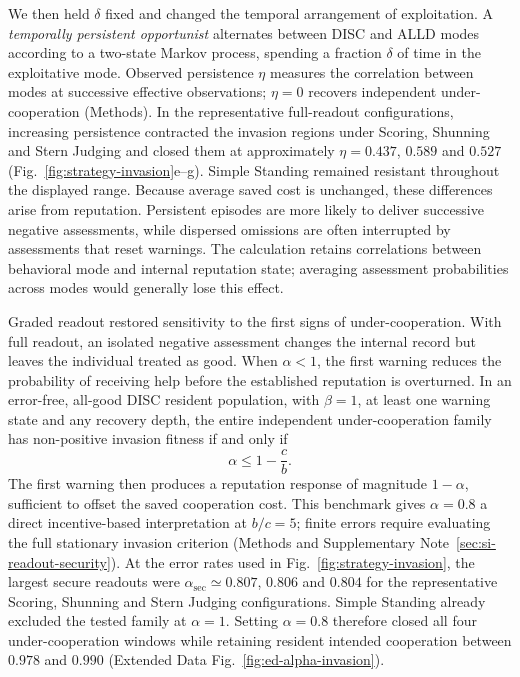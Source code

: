 \documentclass[fleqn,10pt]{wlscirep}
\begin{document}
We then held $\delta$ fixed and changed the temporal arrangement of exploitation. A \emph{temporally persistent opportunist} alternates between DISC and ALLD modes according to a two-state Markov process, spending a fraction $\delta$ of time in the exploitative mode. Observed persistence $\eta$ measures the correlation between modes at successive effective observations; $\eta=0$ recovers independent under-cooperation (Methods). In the representative full-readout configurations, increasing persistence contracted the invasion regions under Scoring, Shunning and Stern Judging and closed them at approximately $\eta=0.437$, $0.589$ and $0.527$ (Fig.~\ref{fig:strategy-invasion}e--g). Simple Standing remained resistant throughout the displayed range. Because average saved cost is unchanged, these differences arise from reputation. Persistent episodes are more likely to deliver successive negative assessments, while dispersed omissions are often interrupted by assessments that reset warnings. The calculation retains correlations between behavioral mode and internal reputation state; averaging assessment probabilities across modes would generally lose this effect.

Graded readout restored sensitivity to the first signs of under-cooperation. With full readout, an isolated negative assessment changes the internal record but leaves the individual treated as good. When $\alpha<1$, the first warning reduces the probability of receiving help before the established reputation is overturned. In an error-free, all-good DISC resident population, with $\beta=1$, at least one warning state and any recovery depth, the entire independent under-cooperation family has non-positive invasion fitness if and only if
\begin{equation}
\alpha\leq1-\frac cb.
\label{eq:results-alpha-security-benchmark}
\end{equation}
The first warning then produces a reputation response of magnitude $1-\alpha$, sufficient to offset the saved cooperation cost. This benchmark gives $\alpha=0.8$ a direct incentive-based interpretation at $b/c=5$; finite errors require evaluating the full stationary invasion criterion (Methods and Supplementary Note~\ref{sec:si-readout-security}). At the error rates used in Fig.~\ref{fig:strategy-invasion}, the largest secure readouts were $\alpha_{\mathrm{sec}}\simeq0.807$, $0.806$ and $0.804$ for the representative Scoring, Shunning and Stern Judging configurations. Simple Standing already excluded the tested family at $\alpha=1$. Setting $\alpha=0.8$ therefore closed all four under-cooperation windows while retaining resident intended cooperation between $0.978$ and $0.990$ (Extended Data Fig.~\ref{fig:ed-alpha-invasion}).
\end{document}
